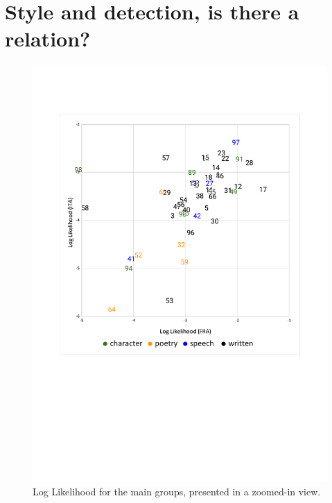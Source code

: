 \documentclass[
twocolumn,
]{ceurart}
\begin{document}

\section{Style and detection, is there a relation?}

\begin{figure}[t]
    \includegraphics[trim=0.5cm 0cm 0.5cm 0.5cm, clip, width=\columnwidth]{LL-zoom.pdf}
    \centering
    \caption{Log Likelihood for the main groups, presented in a zoomed-in view.}
    \label{fig:ll_corr_ita_fra_zoom}
    
\end{figure}
\end{document}
